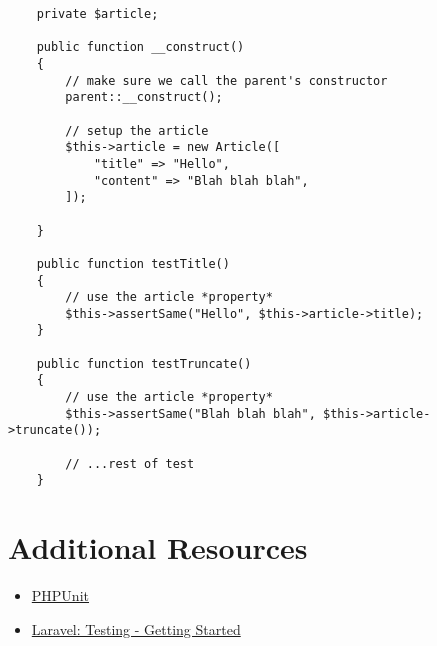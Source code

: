 \begin{verbatim}
    private $article;

    public function __construct()
    {
        // make sure we call the parent's constructor
        parent::__construct();

        // setup the article
        $this->article = new Article([
            "title" => "Hello",
            "content" => "Blah blah blah",
        ]);

    }

    public function testTitle()
    {
        // use the article *property*
        $this->assertSame("Hello", $this->article->title);
    }

    public function testTruncate()
    {
        // use the article *property*
        $this->assertSame("Blah blah blah", $this->article->truncate());

        // ...rest of test
    }
\end{verbatim}



\section{Additional Resources}

\begin{itemize}[leftmargin=*]
    \item \href{https://github.com/sebastianbergmann/phpunit}{PHPUnit}
    \item \href{http://laravel.com/docs/6.x/testing}{Laravel: Testing - Getting Started}
\end{itemize}
